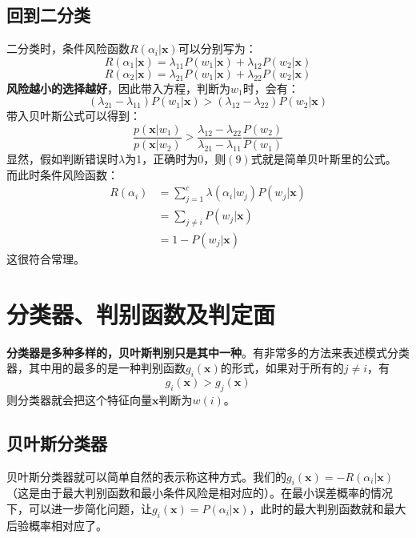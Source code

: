 \documentclass[12pt, letterpaper]{article}
\begin{document}
\subsection{回到二分类}
二分类时，条件风险函数$R(\alpha_i|\mathbf{x})$可以分别写为：
\begin{equation}
R(\alpha_1|\mathbf{x})= \lambda_{11}P(w_1|\mathbf{x})+\lambda_{12}P(w_2|\mathbf{x})
\end{equation}
\begin{equation}
R(\alpha_2|\mathbf{x})= \lambda_{21}P(w_1|\mathbf{x})+\lambda_{22}P(w_2|\mathbf{x})
\end{equation}
\textbf{风险越小的选择越好}，因此带入方程，判断为$w_1$时，会有：
\begin{equation}
(\lambda_{21}-\lambda_{11})P(w_1|\mathbf{x})>(\lambda_{12}-\lambda_{22})P(w_2|\mathbf{x})
\end{equation}
带入贝叶斯公式可以得到：
\begin{equation}
\frac{p(\mathbf{x}|w_1)}{p(\mathbf{x}|w_2)}>\frac{\lambda_{12}-\lambda_{22}}{\lambda_{21}-\lambda_{11}}\frac{P(w_2)}{P(w_1)}
\end{equation}
显然，假如判断错误时$\lambda$为1，正确时为0，则$(9)$式就是简单贝叶斯里的公式。
而此时条件风险函数：
\begin{equation}
\begin{aligned}
R(\alpha_i)&=\sum_{j=1}^{c}\lambda(\alpha_{i}|w_j)P(w_j|\mathbf{x})\\
&=\sum_{j\neq i}P(w_j|\mathbf{x})\\
&=1-P(w_j|\mathbf{x})
\end{aligned}
\end{equation}
这很符合常理。
\section{分类器、判别函数及判定面}
\textbf{分类器是多种多样的，贝叶斯判别只是其中一种}。有非常多的方法来表述模式分类器，其中用的最多的是一种判别函数$g_i(\mathbf{x})$的形式，如果对于所有的$j\neq i$，有
\begin{equation}
g_i(\mathbf{x})>g_j(\mathbf{x})
\end{equation}
则分类器就会把这个特征向量$\mathbf{x}$判断为$w(i)$。

\subsection{贝叶斯分类器}
贝叶斯分类器就可以简单自然的表示称这种方式。我们的$g_i(\mathbf{x})=-R(\alpha_i|\mathbf{x})$（这是由于最大判别函数和最小条件风险是相对应的）。在最小误差概率的情况下，可以进一步简化问题，让$g_i(\mathbf{x})=P(\alpha_i|\mathbf{x})$，此时的最大判别函数就和最大后验概率相对应了。
\end{document}
